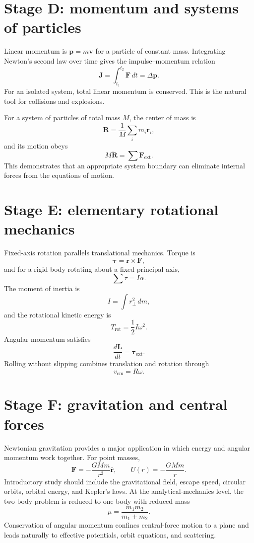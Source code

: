 \section{Stage D: momentum and systems of particles}

Linear momentum is $\mathbf p=m\mathbf v$ for a particle of constant mass.  Integrating Newton's
second law over time gives the impulse--momentum relation
\[
\mathbf J=\int_{t_1}^{t_2}\mathbf F\,dt=\Delta\mathbf p.
\]
For an isolated system, total linear momentum is conserved.  This is the natural tool for collisions
and explosions.

For a system of particles of total mass $M$, the center of mass is
\[
\mathbf R=\frac{1}{M}\sum_i m_i\mathbf r_i,
\]
and its motion obeys
\[
M\ddot{\mathbf R}=\sum \mathbf F_{\mathrm{ext}}.
\]
This demonstrates that an appropriate system boundary can eliminate internal forces from the
equations of motion.

\section{Stage E: elementary rotational mechanics}

Fixed-axis rotation parallels translational mechanics.  Torque is
\[
\boldsymbol\tau=\mathbf r\times\mathbf F,
\]
and for a rigid body rotating about a fixed principal axis,
\[
\sum\tau=I\alpha.
\]
The moment of inertia is
\[
I=\int r_\perp^2\,dm,
\]
and the rotational kinetic energy is
\[
T_{\mathrm{rot}}=\frac12 I\omega^2.
\]
Angular momentum satisfies
\[
\frac{d\mathbf L}{dt}=\boldsymbol\tau_{\mathrm{ext}}.
\]
Rolling without slipping combines translation and rotation through
\[
v_{\mathrm{cm}}=R\omega.
\]

\section{Stage F: gravitation and central forces}

Newtonian gravitation provides a major application in which energy and angular momentum work
together.  For point masses,
\[
\mathbf F=-\frac{GMm}{r^2}\hat{\mathbf r},
\qquad
U(r)=-\frac{GMm}{r}.
\]
Introductory study should include the gravitational field, escape speed, circular orbits, orbital
energy, and Kepler's laws.  At the analytical-mechanics level, the two-body problem is reduced to
one body with reduced mass
\[
\mu=\frac{m_1m_2}{m_1+m_2}.
\]
Conservation of angular momentum confines central-force motion to a plane and leads naturally to
effective potentials, orbit equations, and scattering.

